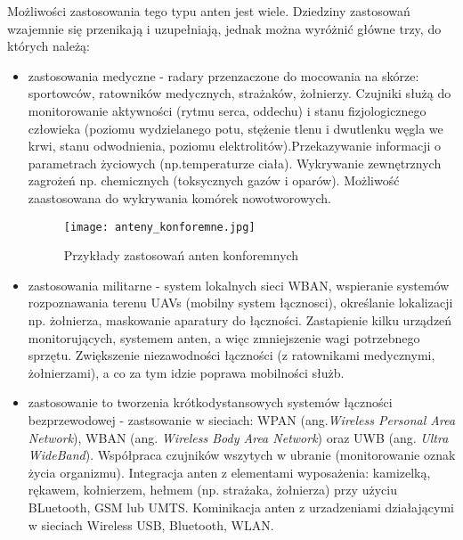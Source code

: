 Możliwości zastosowania tego typu anten jest wiele. Dziedziny zastosowań wzajemnie się przenikają i uzupełniają, jednak można wyróżnić główne trzy, do których należą:

\begin{itemize}\setlength{\itemsep}{0pt}
	
	\item zastosowania medyczne - radary przenzaczone do mocowania na skórze: sportowców, ratowników medycznych, strażaków, żołnierzy. Czujniki służą do monitorowanie aktywności (rytmu serca, oddechu) i stanu fizjologicznego człowieka (poziomu wydzielanego potu, stężenie tlenu i dwutlenku węgla we krwi, stanu odwodnienia, poziomu elektrolitów).Przekazywanie informacji o parametrach życiowych (np.temperaturze ciała). Wykrywanie zewnętrznych zagrożeń np. chemicznych (toksycznych gazów i oparów). Możliwość zaastosowana do wykrywania komórek nowotworowych.  

\begin{figure}[h!]
\centering
	\texttt{[image: anteny\_konforemne.jpg]}
	\caption{Przykłady zastosowań anten konforemnych}
\end{figure}

	\item zastosowania militarne - system lokalnych sieci WBAN, wspieranie systemów rozpoznawania terenu UAVs (mobilny system łącznosci), określanie lokalizacji np. żołnierza, maskowanie aparatury do łączności.
	Zastapienie kilku urządzeń monitorujących, systemem anten, a więc zmniejszenie wagi potrzebnego sprzętu. Zwiększenie niezawodności łączności (z ratownikami medycznymi, żołnierzami), a co za tym idzie poprawa mobilności służb.       

	\item zastosowanie to tworzenia krótkodystansowych systemów łączności bezprzewodowej - zastsowanie w sieciach: WPAN (ang.\emph{Wireless Personal Area Network}), WBAN (ang. \emph{Wireless Body Area Network}) oraz UWB (ang. \emph{Ultra WideBand}). Współpraca czujników wszytych w ubranie (monitorowanie oznak życia organizmu). Integracja anten z elementami wyposażenia: kamizelką, rękawem, kołnierzem, hełmem (np. strażaka, żołnierza) przy użyciu BLuetooth, GSM lub UMTS. Kominikacja anten z urzadzeniami działającymi w sieciach Wireless USB, Bluetooth, WLAN.  

\end{itemize}














